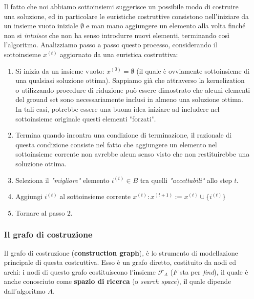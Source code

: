 \documentclass{article}
\begin{document}
    Il fatto che noi abbiamo sottoinsiemi suggerisce un possibile modo di costruire una soluzione,
    ed in particolare le euristiche costruttive consistono nell'iniziare da un insieme vuoto
    iniziale $\emptyset$ e man mano aggiungere un elemento alla volta finché non si \textit{intuisce}
    che non ha senso introdurre nuovi elementi, terminando così l'algoritmo.
    Analizziamo passo a passo questo processo, considerando il sottoinsieme $x^{(t)}$
    aggiornato da una euristica costruttiva:
    \begin{enumerate}
        \item Si inizia da un insieme vuoto: $x^{(0)}=\emptyset$ (il quale è ovviamente
              sottoinsieme di una qualsiasi soluzione ottima). Sappiamo già che attraverso la
              kernelization o utilizzando procedure di riduzione può essere dimostrato che
              alcuni elementi del ground set sono necessariamente inclusi in almeno una soluzione ottima.
              In tali casi, potrebbe essere una buona idea iniziare ad includere nel sottoinsieme originale
              questi elementi "forzati".

        \item Termina quando incontra una condizione di terminazione, il razionale di questa condizione
              consiste nel fatto che aggiungere un elemento nel sottoinsieme corrente non avrebbe alcun senso
              visto che non restituirebbe una soluzione ottima.

        \item Seleziona il \textit{"migliore"} elemento $i^{(t)}\in B$ tra quelli \textit{"accettabili"}
              allo step $t$.

        \item Aggiungi $i^{(t)}$ al sottoinsieme corrente $x^{(t)}:x^{(t+1)}:=x^{(t)}\cup\{ i^{(t)}\}$
        \item Tornare al passo $2$.
    \end{enumerate}

    \subsubsection{Il grafo di costruzione}
    Il grafo di costruzione (\textbf{construction graph}), è lo strumento di modellazione principale
    di questa costruttiva. Esso è un grafo diretto, costituito da nodi ed archi: i nodi di questo grafo
    costituiscono l'insieme $\mathcal{F}_A$ ($F$ sta per \textit{find}), il quale è anche conosciuto come
    \textbf{spazio di ricerca} (o \textit{search space}), il quale dipende dall'algoritmo $A$.
\end{document}
